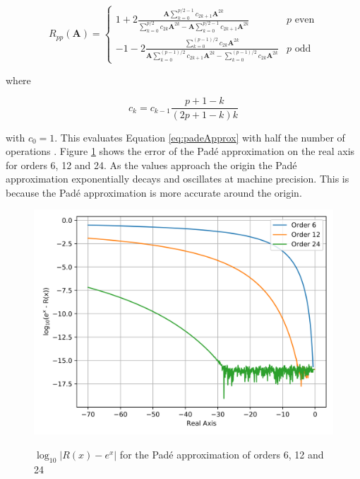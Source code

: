 \begin{equation}
    R_{pp}(\boldsymbol{A})=
    \begin{cases}
        1+2\frac{\boldsymbol{A}\sum_{k=0}^{p/2-1}c_{2k+1}\boldsymbol{A}^{2k}}{\sum_{k=0}^{p/2}c_{2k}\boldsymbol{A}^{2k}-\boldsymbol{A}\sum_{k=0}^{p/2-1}c_{2k+1}\boldsymbol{A}^{2k}} & p \text{ even}\\[1em]
        
        -1-2\frac{\sum_{k=0}^{(p-1)/2}c_{2k}\boldsymbol{A}^{2k}}{\boldsymbol{A}\sum_{k=0}^{(p-1)/2}c_{2k+1}\boldsymbol{A}^{2k}-\sum_{k=0}^{(p-1)/2}c_{2k}\boldsymbol{A}^{2k}} & p \text{ odd}
    \end{cases}
    \label{eq:hornerPadeApprox}
\end{equation}

\noindent where

\begin{equation*}
    c_{k} = c_{k-1}\frac{p+1-k}{(2p+1-k)k}
\end{equation*}

\noindent with $c_{0} = 1$. This evaluates Equation \ref{eq:padeApprox} with half the number of operations \cite{exokit}. Figure \ref{fig:PadeApproxError} shows the error of the Pad\'e approximation on the real axis for orders 6, 12 and 24. As the values approach the origin the Pad\'e approximation exponentially decays and oscillates at machine precision. This is because the Pad\'e approximation is more accurate around the origin. 

\begin{figure}[ht]
  \centering
  \includegraphics[width=5in]{images/padeError.png}\\
  \caption{$\log_{10}|R(x)-e^{x}|$ for the Pad\'e approximation of orders 6, 12 and 24}
  \label{fig:PadeApproxError}
\end{figure} 


